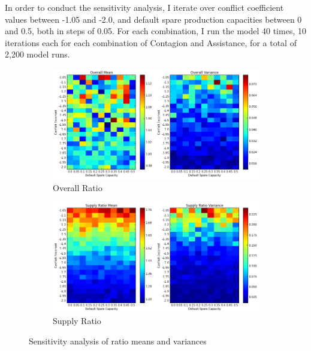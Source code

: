 \documentclass{article}
\begin{document}
In order to conduct the sensitivity analysis, I iterate over conflict coefficient values between -1.05 and -2.0, and default spare production capacities between 0 and 0.5, both in steps of 0.05. For each combination, I run the model 40 times, 10 iterations each for each combination of Contagion and Assistance, for a total of 2,200 model runs. 

\begin{figure}[h!]
	\centering
	\begin{subfigure}{\textwidth}
		\includegraphics[width=\textwidth]{../Graphics/SensitivityAnalysisOverall}
		\caption{Overall Ratio}
	\end{subfigure}

	\begin{subfigure}{\textwidth}
		\includegraphics[width=\textwidth]{../Graphics/SensitivityAnalysisSupply}
		\caption{Supply Ratio}
	\end{subfigure}

	\caption{Sensitivity analysis of ratio means and variances}
\end{figure}
\end{document}

